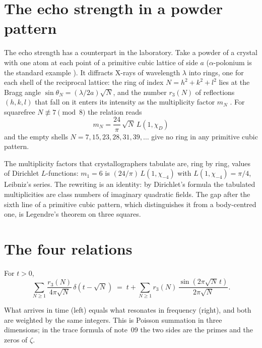 \documentclass[11pt]{article}
\begin{document}
\section{The echo strength in a powder pattern}

The echo strength has a counterpart in the laboratory.
Take a powder of a crystal with one atom at each point of a primitive cubic lattice of side $a$ ($\alpha$-polonium is the standard example \cite{BeamerMaxwell}).
It diffracts X-rays of wavelength $\lambda$ into rings, one for each shell of the reciprocal lattice: the ring of index $N = h^2+k^2+l^2$ lies at the Bragg angle $\sin\theta_N = (\lambda/2a)\sqrt N$, and the number $r_3(N)$ of reflections $(h,k,l)$ that fall on it enters its intensity as the multiplicity factor $m_N$ \cite{Cullity}.
For squarefree $N\not\equiv 7\pmod 8$ the relation reads
\[
  \boxed{\;m_N = \frac{24}{\pi}\,\sqrt N\,L(1,\chi_D)\;}
\]
and the empty shells $N = 7, 15, 23, 28, 31, 39,\dots$ give no ring in any primitive cubic pattern.

\physical
The multiplicity factors that crystallographers tabulate are, ring by ring, values of Dirichlet $L$-functions: $m_1 = 6$ is $(24/\pi)\,L(1,\chi_{-4})$ with $L(1,\chi_{-4}) = \pi/4$, Leibniz's series.
The rewriting is an identity: by Dirichlet's formula the tabulated multiplicities are class numbers of imaginary quadratic fields.
The gap after the sixth line of a primitive cubic pattern, which distinguishes it from a body-centred one, is Legendre's theorem on three squares.

\section{The four relations}

\begin{derivation}\label{d:duality}
For $t>0$,
\[
  \sum_{N\ge1}\frac{r_3(N)}{4\pi\sqrt N}\,\delta(t-\sqrt N) \;=\; t+\sum_{N\ge1}r_3(N)\,\frac{\sin(2\pi\sqrt N\,t)}{2\pi\sqrt N}.
\]
\end{derivation}

\physical
What arrives in time (left) equals what resonates in frequency (right), and both are weighted by the same integers.
This is Poisson summation in three dimensions; in the trace formula of note~09 the two sides are the primes and the zeros of $\zeta$.
\end{document}
